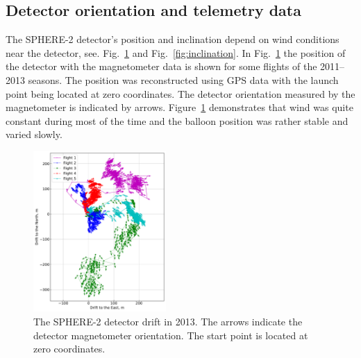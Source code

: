\documentclass[final,5p,times,twocolumn]{elsarticle}
\begin{document}

\subsection{Detector orientation and telemetry data}
\label{sect:telemetrydata}

The \mbox{SPHERE-2} detector's position and inclination depend on wind conditions near the detector, see. Fig.~\ref{fig:gps_compass} and Fig.~\ref{fig:inclination}. In Fig.~\ref{fig:gps_compass} the position of the detector with the magnetometer data is shown for some flights of the 2011--2013 seasons. The position was reconstructed using GPS data with the launch point being located at zero coordinates. The detector orientation measured by the magnetometer is indicated by arrows. Figure~\ref{fig:gps_compass} demonstrates that wind was quite constant during most of the time and the balloon position was rather stable and varied slowly.  
\begin{figure}[tb]
    \includegraphics[width=0.45\textwidth]{GPS+quiver.pdf}\hspace{2pc}%
    \caption{The SPHERE-2 detector drift in 2013. The arrows indicate the detector magnetometer orientation. The start point is located at zero coordinates.}
\label{fig:gps_compass}
\end{figure}
\end{document}
